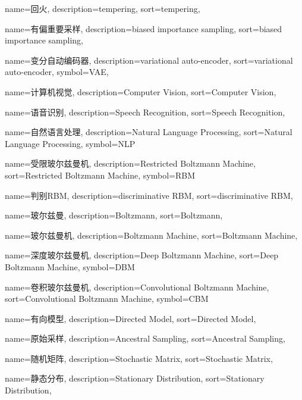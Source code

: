 {
  name=回火,
  description={tempering},
  sort={tempering},
}

{
  name=有偏重要采样,
  description={biased importance sampling},
  sort={biased importance sampling},
}

{
  name=变分自动编码器,
  description={variational auto-encoder},
  sort={variational auto-encoder},
  symbol={VAE},
}

{
  name=计算机视觉,
  description={Computer Vision},
  sort={Computer Vision},
}

{
  name=语音识别,
  description={Speech Recognition},
  sort={Speech Recognition},
}

{
  name=自然语言处理,
  description={Natural Language Processing},
  sort={Natural Language Processing},
  symbol={NLP}
}

{
  name=受限玻尔兹曼机,
  description={Restricted Boltzmann Machine},
  sort={Restricted Boltzmann Machine},
  symbol={RBM}
}

{
  name=判别RBM,
  description={discriminative RBM},
  sort={discriminative RBM},
}

{
  name=玻尔兹曼,
  description={Boltzmann},
  sort={Boltzmann},
}

{
  name=玻尔兹曼机,
  description={Boltzmann Machine},
  sort={Boltzmann Machine},
}

{
  name=深度玻尔兹曼机,
  description={Deep Boltzmann Machine},
  sort={Deep Boltzmann Machine},
  symbol={DBM}
}

{
  name=卷积玻尔兹曼机,
  description={Convolutional Boltzmann Machine},
  sort={Convolutional Boltzmann Machine},
  symbol={CBM}
}

{
  name=有向模型,
  description={Directed Model},
  sort={Directed Model},
}

{
  name=原始采样,
  description={Ancestral Sampling},
  sort={Ancestral Sampling},
}

{
  name=随机矩阵,
  description={Stochastic Matrix},
  sort={Stochastic Matrix},
}

{
  name=静态分布,
  description={Stationary Distribution},
  sort={Stationary Distribution},
}

